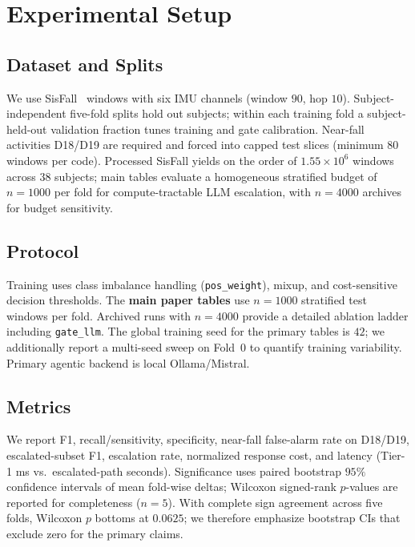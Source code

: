 \documentclass[journal]{IEEEtran}
\begin{document}



\section{Experimental Setup}
\label{sec:setup}

\subsection{Dataset and Splits}
We use SisFall~\cite{sisfall2017} windows with six IMU channels (window $90$, hop $10$). Subject-independent five-fold splits hold out subjects; within each training fold a subject-held-out validation fraction tunes training and gate calibration. Near-fall activities D18/D19 are required and forced into capped test slices (minimum $80$ windows per code). Processed SisFall yields on the order of $1.55{\times}10^{6}$ windows across $38$ subjects; main tables evaluate a homogeneous stratified budget of $n{=}1000$ per fold for compute-tractable LLM escalation, with $n{=}4000$ archives for budget sensitivity.

\subsection{Protocol}
Training uses class imbalance handling (\texttt{pos\_weight}), mixup, and cost-sensitive decision thresholds. The \textbf{main paper tables} use $n{=}1000$ stratified test windows per fold. Archived runs with $n{=}4000$ provide a detailed ablation ladder including \texttt{gate\_llm}. The global training seed for the primary tables is $42$; we additionally report a multi-seed sweep on Fold~0 to quantify training variability. Primary agentic backend is local Ollama/Mistral.

\subsection{Metrics}
We report F1, recall/sensitivity, specificity, near-fall false-alarm rate on D18/D19, escalated-subset F1, escalation rate, normalized response cost, and latency (Tier-1 ms vs.\ escalated-path seconds). Significance uses paired bootstrap $95\%$ confidence intervals of mean fold-wise deltas; Wilcoxon signed-rank $p$-values are reported for completeness ($n{=}5$). With complete sign agreement across five folds, Wilcoxon $p$ bottoms at $0.0625$; we therefore emphasize bootstrap CIs that exclude zero for the primary claims.
\end{document}
